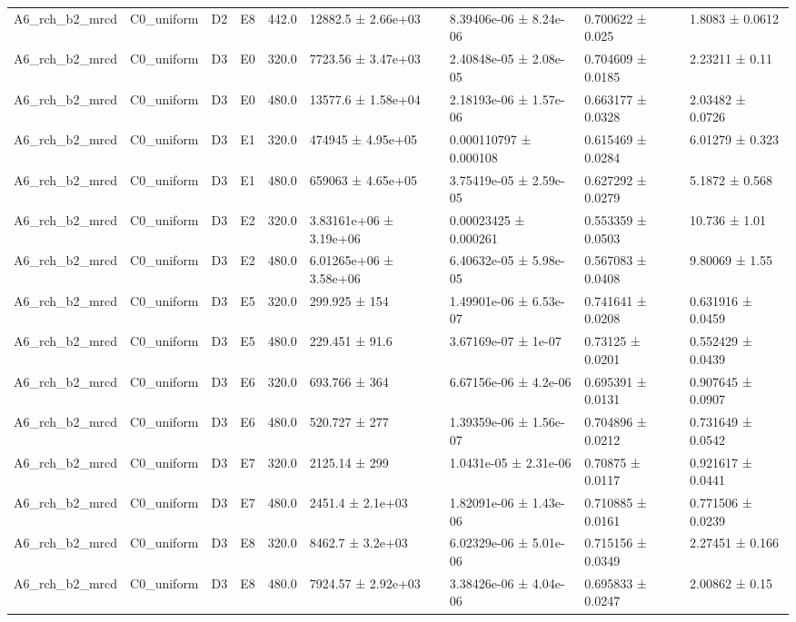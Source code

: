 \begin{table}
\begin{tabular}{lllllllll}
A6\_rch\_b2\_mrcd & C0\_uniform & D2 & E8 & 442.0 & 12882.5 ± 2.66e+03 & 8.39406e-06 ± 8.24e-06 & 0.700622 ± 0.025 & 1.8083 ± 0.0612 \\
A6\_rch\_b2\_mrcd & C0\_uniform & D3 & E0 & 320.0 & 7723.56 ± 3.47e+03 & 2.40848e-05 ± 2.08e-05 & 0.704609 ± 0.0185 & 2.23211 ± 0.11 \\
A6\_rch\_b2\_mrcd & C0\_uniform & D3 & E0 & 480.0 & 13577.6 ± 1.58e+04 & 2.18193e-06 ± 1.57e-06 & 0.663177 ± 0.0328 & 2.03482 ± 0.0726 \\
A6\_rch\_b2\_mrcd & C0\_uniform & D3 & E1 & 320.0 & 474945 ± 4.95e+05 & 0.000110797 ± 0.000108 & 0.615469 ± 0.0284 & 6.01279 ± 0.323 \\
A6\_rch\_b2\_mrcd & C0\_uniform & D3 & E1 & 480.0 & 659063 ± 4.65e+05 & 3.75419e-05 ± 2.59e-05 & 0.627292 ± 0.0279 & 5.1872 ± 0.568 \\
A6\_rch\_b2\_mrcd & C0\_uniform & D3 & E2 & 320.0 & 3.83161e+06 ± 3.19e+06 & 0.00023425 ± 0.000261 & 0.553359 ± 0.0503 & 10.736 ± 1.01 \\
A6\_rch\_b2\_mrcd & C0\_uniform & D3 & E2 & 480.0 & 6.01265e+06 ± 3.58e+06 & 6.40632e-05 ± 5.98e-05 & 0.567083 ± 0.0408 & 9.80069 ± 1.55 \\
A6\_rch\_b2\_mrcd & C0\_uniform & D3 & E5 & 320.0 & 299.925 ± 154 & 1.49901e-06 ± 6.53e-07 & 0.741641 ± 0.0208 & 0.631916 ± 0.0459 \\
A6\_rch\_b2\_mrcd & C0\_uniform & D3 & E5 & 480.0 & 229.451 ± 91.6 & 3.67169e-07 ± 1e-07 & 0.73125 ± 0.0201 & 0.552429 ± 0.0439 \\
A6\_rch\_b2\_mrcd & C0\_uniform & D3 & E6 & 320.0 & 693.766 ± 364 & 6.67156e-06 ± 4.2e-06 & 0.695391 ± 0.0131 & 0.907645 ± 0.0907 \\
A6\_rch\_b2\_mrcd & C0\_uniform & D3 & E6 & 480.0 & 520.727 ± 277 & 1.39359e-06 ± 1.56e-07 & 0.704896 ± 0.0212 & 0.731649 ± 0.0542 \\
A6\_rch\_b2\_mrcd & C0\_uniform & D3 & E7 & 320.0 & 2125.14 ± 299 & 1.0431e-05 ± 2.31e-06 & 0.70875 ± 0.0117 & 0.921617 ± 0.0441 \\
A6\_rch\_b2\_mrcd & C0\_uniform & D3 & E7 & 480.0 & 2451.4 ± 2.1e+03 & 1.82091e-06 ± 1.43e-06 & 0.710885 ± 0.0161 & 0.771506 ± 0.0239 \\
A6\_rch\_b2\_mrcd & C0\_uniform & D3 & E8 & 320.0 & 8462.7 ± 3.2e+03 & 6.02329e-06 ± 5.01e-06 & 0.715156 ± 0.0349 & 2.27451 ± 0.166 \\
A6\_rch\_b2\_mrcd & C0\_uniform & D3 & E8 & 480.0 & 7924.57 ± 2.92e+03 & 3.38426e-06 ± 4.04e-06 & 0.695833 ± 0.0247 & 2.00862 ± 0.15 \\

\end{tabular}
\end{table}
